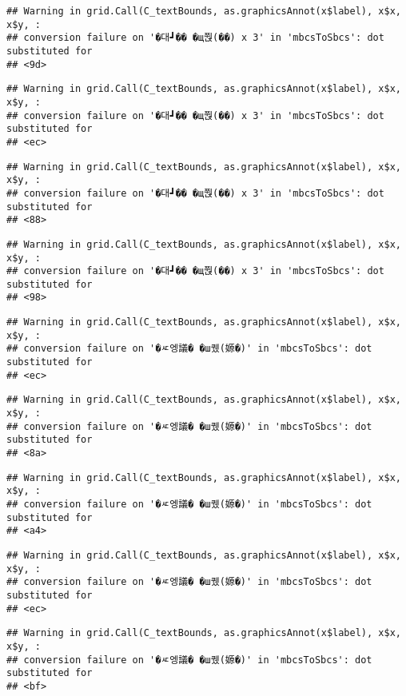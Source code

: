 \documentclass[
]{article}
\begin{document}
\begin{verbatim}
## Warning in grid.Call(C_textBounds, as.graphicsAnnot(x$label), x$x, x$y, :
## conversion failure on '�대┛�� �щ쭩(��) x 3' in 'mbcsToSbcs': dot substituted for
## <9d>
\end{verbatim}

\begin{verbatim}
## Warning in grid.Call(C_textBounds, as.graphicsAnnot(x$label), x$x, x$y, :
## conversion failure on '�대┛�� �щ쭩(��) x 3' in 'mbcsToSbcs': dot substituted for
## <ec>
\end{verbatim}

\begin{verbatim}
## Warning in grid.Call(C_textBounds, as.graphicsAnnot(x$label), x$x, x$y, :
## conversion failure on '�대┛�� �щ쭩(��) x 3' in 'mbcsToSbcs': dot substituted for
## <88>
\end{verbatim}

\begin{verbatim}
## Warning in grid.Call(C_textBounds, as.graphicsAnnot(x$label), x$x, x$y, :
## conversion failure on '�대┛�� �щ쭩(��) x 3' in 'mbcsToSbcs': dot substituted for
## <98>
\end{verbatim}

\begin{verbatim}
## Warning in grid.Call(C_textBounds, as.graphicsAnnot(x$label), x$x, x$y, :
## conversion failure on '�ㅼ엥議� �ш퀬(嫄�)' in 'mbcsToSbcs': dot substituted for
## <ec>
\end{verbatim}

\begin{verbatim}
## Warning in grid.Call(C_textBounds, as.graphicsAnnot(x$label), x$x, x$y, :
## conversion failure on '�ㅼ엥議� �ш퀬(嫄�)' in 'mbcsToSbcs': dot substituted for
## <8a>
\end{verbatim}

\begin{verbatim}
## Warning in grid.Call(C_textBounds, as.graphicsAnnot(x$label), x$x, x$y, :
## conversion failure on '�ㅼ엥議� �ш퀬(嫄�)' in 'mbcsToSbcs': dot substituted for
## <a4>
\end{verbatim}

\begin{verbatim}
## Warning in grid.Call(C_textBounds, as.graphicsAnnot(x$label), x$x, x$y, :
## conversion failure on '�ㅼ엥議� �ш퀬(嫄�)' in 'mbcsToSbcs': dot substituted for
## <ec>
\end{verbatim}

\begin{verbatim}
## Warning in grid.Call(C_textBounds, as.graphicsAnnot(x$label), x$x, x$y, :
## conversion failure on '�ㅼ엥議� �ш퀬(嫄�)' in 'mbcsToSbcs': dot substituted for
## <bf>
\end{verbatim}
\end{document}
